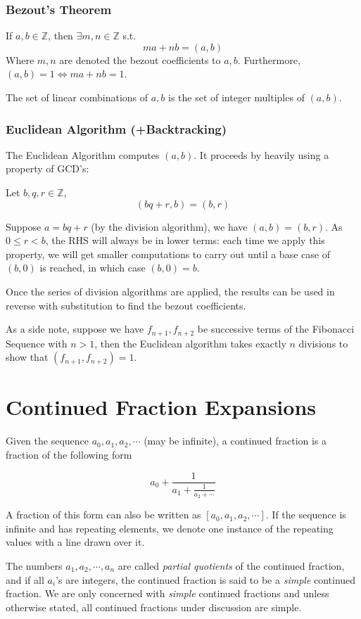 \documentclass{article}
\begin{document}
\begin{multicols*}{2}
\subsubsection*{Bezout's Theorem}

If $a, b \in \mathbb{Z}$, then $\exists m,n \in \mathbb{Z}$ s.t. \[ma + nb = (a, b)\] Where $m,n$ are denoted the bezout coefficients to $a, b$. Furthermore, $(a,b) = 1 \Leftrightarrow ma +nb = 1$.

The set of linear combinations of $a,b$ is the set of integer multiples of $(a, b)$.

\subsubsection*{Euclidean Algorithm (+Backtracking)}

The Euclidean Algorithm computes $(a,b)$. It proceeds by heavily using a property of GCD's:

Let $b,q,r \in \mathbb{Z}$, \[(bq + r, b) = (b, r)\]

Suppose $a = bq+r$ (by the division algorithm), we have $(a,b) = (b, r)$. As $0 \leq r < b$, the RHS will always be in lower terms: each time we apply this property, we will get smaller computations to carry out until a base case of $(b, 0)$ is reached, in which case $(b, 0) = b$.

Once the series of division algorithms are applied, the results can be used in reverse with substitution to find the bezout coefficients.

As a side note, suppose we have $f_{n+1}, f_{n+2}$ be successive terms of the Fibonacci Sequence with $n > 1$, then the Euclidean algorithm takes exactly $n$ divisions to show that $(f_{n+1}, f_{n+2})= 1$.

\section{Continued Fraction Expansions}

Given the sequence $a_0, a_1, a_2, \cdots$ (may be infinite), a continued fraction is a fraction of the following form

\[a_0 + \frac{1}{a_1 + \frac{1}{a_2 + \cdots}}\]

A fraction of this form can also be written as $[a_0,a_1, a_2, \cdots]$. If the sequence is infinite and has repeating elements, we denote one instance of the repeating values with a line drawn over it.

The numbers $a_1, a_2, \cdots, a_n$ are called \textit{partial quotients} of the continued fraction, and if all $a_i$'s are integers, the continued fraction is said to be a \textit{simple} continued fraction. We are only concerned with \textit{simple} continued fractions and unless otherwise stated, all continued fractions under discussion are simple.


\end{multicols*}
\end{document}
